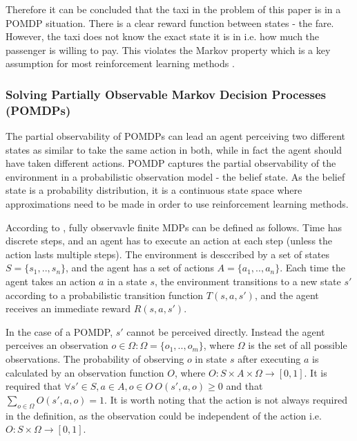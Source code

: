 Therefore it can be concluded that the taxi in the problem of this paper is in
a POMDP situation. There is a clear reward function between states - the fare.
However, the taxi does not know the exact state it is in i.e. how much the
passenger is willing to pay. This violates the Markov property which is a key
assumption for most reinforcement learning methods
\parencite{Sutton1998ai+reinforcement}.

\subsubsection{Solving Partially Observable Markov Decision Processes (POMDPs)}
\label{sec:ai:pomdp}

The partial observability of POMDPs can lead an agent perceiving two different
states as similar to take the same action in both, while in fact the agent
should have taken different actions. POMDP captures the partial observability
of the environment in a probabilistic observation model - the belief state. As
the belief state is a probability distribution, it is a continuous state space
where approximations need to be made in order to use reinforcement learning
methods. \parencite{Russell2010ai+modern}

According to \textcite{Spaan2012ai+pomdp}, fully observavle finite MDPs can be
defined as follows. Time has discrete steps, and an agent has to execute an
action at each step (unless the action lasts multiple steps). The environment
is desccribed by a set of states \(S = \{s_1,..,s_n\}\), and the agent has a
set of actions \(A = \{a_1,..,a_n\}\). Each time the agent takes an action
\(a\) in a state \(s\), the environment transitions to a new state \(s'\)
according to a probabilistic transition function \(T(s,a,s')\), and the agent
receives an immediate reward \(R(s,a,s')\).

In the case of a POMDP, \(s'\) cannot be perceived directly. Instead the agent
perceives an observation \(o \in \Omega : \Omega = \{o_1,..,o_m\}\), where
\(\Omega\) is the set of all possible observations. The probability of
observing \(o\) in state \(s\) after executing \(a\) is calculated by an
observation function \(O\), where \(O : S \times A \times \Omega \rightarrow
[0,1] \). It is required that \(\forall s' \in S, a \in A, o \in O ~ O (s', a,
o) \geq 0 \) and that \(\sum_{o \in \Omega}^{} O (s', a, o) = 1 \). It is worth
noting that the action is not always required in the definition, as the
observation could be independent of the action i.e. \(O : S \times \Omega
\rightarrow [0,1] \). \parencite{Spaan2012ai+pomdp}

